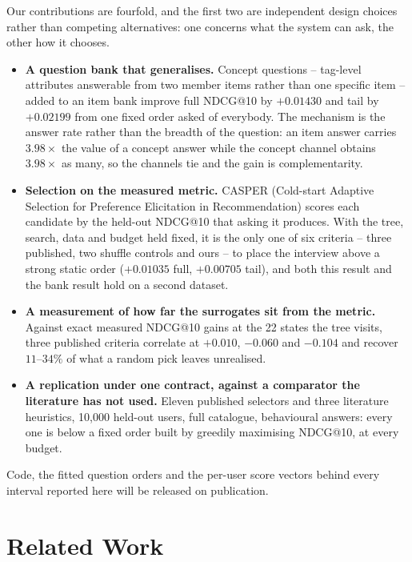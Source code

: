 \documentclass[runningheads]{llncs}
\begin{document}
\noindent Our contributions are fourfold, and the first two are independent design choices rather
than competing alternatives: one concerns what the system can ask, the other how it chooses.
\begin{itemize}
\setlength{\itemsep}{1pt}\setlength{\parskip}{0pt}\setlength{\topsep}{2pt}
\item \textbf{A question bank that generalises.} Concept questions -- tag-level attributes
answerable from two member items rather than one specific item -- added to an item bank improve full NDCG@10 by $+0.01430$ and tail by $+0.02199$ from one
fixed order asked of everybody. The mechanism is the answer rate rather than the breadth of the
question: an item answer carries $3.98\times$ the value of a concept answer while the concept
channel obtains $3.98\times$ as many, so the channels tie and the gain is complementarity.
\item \textbf{Selection on the measured metric.} CASPER (Cold-start Adaptive Selection for
Preference Elicitation in Recommendation) scores each candidate by the held-out NDCG@10 that asking
it produces. With the tree, search, data and budget held fixed, it is the only one of six criteria --
three published, two shuffle controls and ours -- to place the interview above a strong static order
($+0.01035$ full, $+0.00705$ tail), and both this result and the bank result hold on a second
dataset.
\item \textbf{A measurement of how far the surrogates sit from the metric.} Against exact measured NDCG@10 gains at the 22 states the tree visits, three published criteria
correlate at $+0.010$, $-0.060$ and $-0.104$ and recover $11$--$34\%$ of what a random pick leaves
unrealised.
\item \textbf{A replication under one contract, against a comparator the literature has not used.}
Eleven published selectors and three literature heuristics, 10{,}000 held-out users, full
catalogue, behavioural answers: every one is below a fixed order built by greedily maximising
NDCG@10, at every budget.
\end{itemize}

Code, the fitted question orders and the per-user score vectors behind every interval reported here
will be released on publication.

\section{Related Work}
\label{sec:rw}
\end{document}
